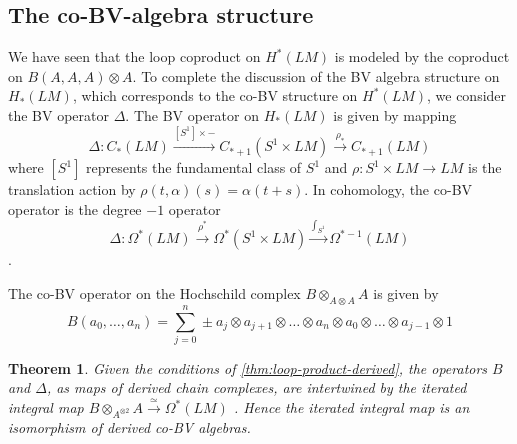 \documentclass{scrartcl}
\theoremstyle{plain}
\newtheorem{theorem}{Theorem}[section]
\theoremstyle{definition}
\newcommand{\quiso}{\simeq}
\let\xto\xrightarrow
\newcommand{\blank}{-}
\begin{document}
\subsection{The co-BV-algebra structure} \label{subsec:co-bv-alg}
We have seen that the loop coproduct on $H^*(LM)$ is modeled by the coproduct on $B(A, A, A)\otimes A$. To complete the discussion of the BV algebra structure on $H_*(LM)$, which corresponds to the co-BV structure on $H^*(LM)$, we consider the BV operator $\Delta$. The BV operator on $H_*(LM)$ is given by mapping $$\Delta\colon C_*(LM)\xto{[S^1]\times\blank} C_{*+1}(S^1\times LM)\xto{\rho_*} C_{*+1}(LM)$$
where $[S^1]$ represents the fundamental class of $S^1$ and $\rho\colon S^1\times LM\to LM$ is the translation action by $\rho(t, \alpha)(s) = \alpha(t+s)$. In cohomology, the co-BV operator is the degree $-1$ operator $$\Delta\colon \Omega^*(LM) \xto{\rho^*} \Omega^*(S^1\times LM) \xto{\int_{S^1}} \Omega^{*-1}(LM)$$.

The co-BV operator on the Hochschild complex $B\otimes_{A\otimes A} A$ is given by $$B(a_0, \dots, a_n) = \sum_{j=0}^n \pm a_j\otimes  a_{j+1}\otimes  \dots\otimes  a_n\otimes  a_0\otimes  \dots \otimes a_{j-1} \otimes 1$$

\begin{theorem}\label{thm:bv-iso}
    Given the conditions of \cref{thm:loop-product-derived}, the operators $B$ and $\Delta$, as maps of derived chain complexes, are intertwined by the iterated integral map $B\otimes_{A^{\otimes 2}} A \xto{\quiso}\Omega^*(LM)$ . Hence the iterated integral map is an isomorphism of derived co-BV algebras. 
\end{theorem}
\end{document}

